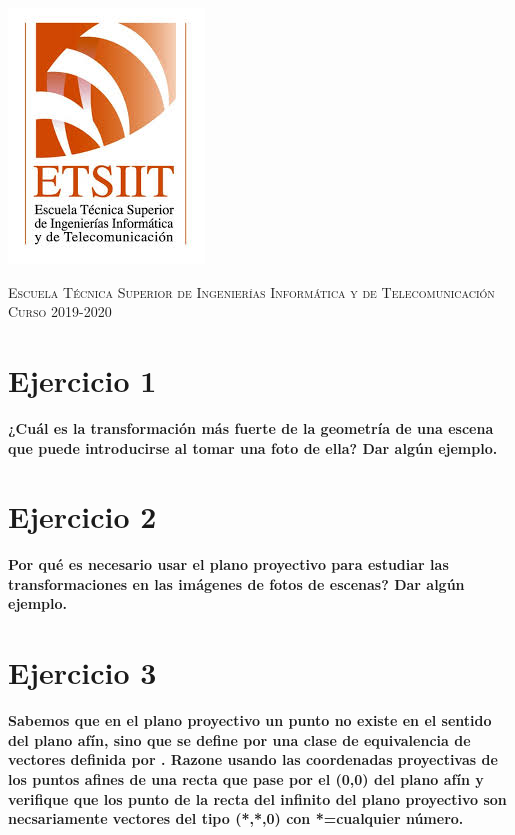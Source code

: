 \documentclass[11pt,a4paper]{article}
\begin{document}
\begin{titlepage}
\begin{minipage}{\textwidth}
\includegraphics[scale=0.3]{img/etsiit.jpeg}

\vspace{0.7cm}
\textsc{Escuela Técnica Superior de Ingenierías Informática y de Telecomunicación}\\
\vspace{1cm}
\textsc{Curso 2019-2020}
\end{minipage}
\end{titlepage}

\tableofcontents
\thispagestyle{empty}				%

\newpage

\setlength{\parskip}{1em}


\section*{Ejercicio 1}
\textbf{¿Cuál es la transformación más fuerte de la geometría de una escena que puede introducirse al tomar una foto de ella? Dar algún ejemplo.}

\section*{Ejercicio 2}
\textbf{Por qué es necesario usar el plano proyectivo para estudiar las transformaciones en las imágenes de fotos de escenas? Dar algún ejemplo.}

\section*{Ejercicio 3}
\textbf{Sabemos que en el plano proyectivo un punto no existe en el sentido del plano afín, sino que se define por una clase de equivalencia de
vectores definida por . Razone usando las coordenadas proyectivas de los puntos afines de una recta que pase por el (0,0) del plano
afín y verifique que los punto de la recta del infinito del plano proyectivo son necsariamente vectores del tipo (*,*,0) con *=cualquier número.}
\end{document}
